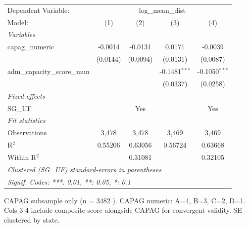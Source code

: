 \begingroup
\centering
\begin{tabular}{lcccc}
   \tabularnewline \midrule \midrule
   Dependent Variable: & \multicolumn{4}{c}{log\_mean\_dist}\\
   Model:                       & (1)      & (2)      & (3)             & (4)\\  
   \midrule
   \emph{Variables}\\
   capag\_numeric               & -0.0014  & -0.0131  & 0.0171          & -0.0039\\   
                                & (0.0144) & (0.0094) & (0.0131)        & (0.0087)\\   
   adm\_capacity\_score\_mun    &          &          & -0.1481$^{***}$ & -0.1050$^{***}$\\   
                                &          &          & (0.0337)        & (0.0258)\\   
   \midrule
   \emph{Fixed-effects}\\
   SG\_UF                       &          & Yes      &                 & Yes\\  
   \midrule
   \emph{Fit statistics}\\
   Observations                 & 3,478    & 3,478    & 3,469           & 3,469\\  
   R$^2$                        & 0.55206  & 0.63056  & 0.56724         & 0.63668\\  
   Within R$^2$                 &          & 0.31081  &                 & 0.32105\\  
   \midrule \midrule
   \multicolumn{5}{l}{\emph{Clustered (SG\_UF) standard-errors in parentheses}}\\
   \multicolumn{5}{l}{\emph{Signif. Codes: ***: 0.01, **: 0.05, *: 0.1}}\\
\end{tabular}
 
\par \raggedright 
CAPAG subsample only (n = 3482 ). CAPAG numeric: A=4, B=3, C=2, D=1. Cols 3-4 include composite score alongside CAPAG for convergent validity. SE clustered by state.
\par\endgroup
